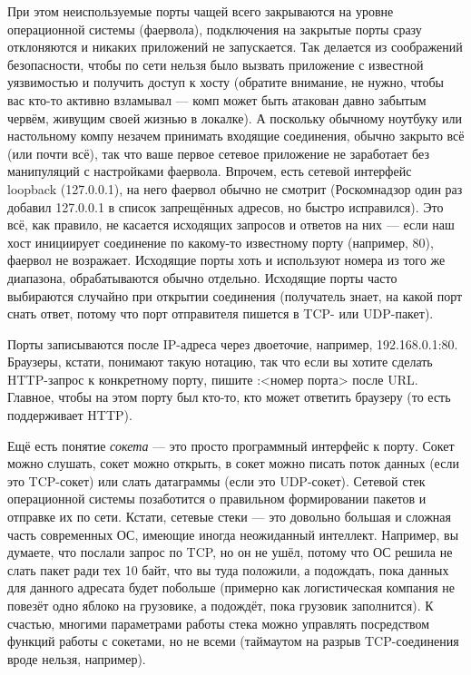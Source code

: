 \documentclass[a5paper]{article}
\begin{document}
При этом неиспользуемые порты чащей всего закрываются на уровне операционной системы (фаервола), подключения на закрытые порты сразу отклоняются и никаких приложений не запускается. Так делается из соображений безопасности, чтобы по сети нельзя было вызвать приложение с известной уязвимостью и получить доступ к хосту (обратите внимание, не нужно, чтобы вас кто-то активно взламывал --- комп может быть атакован давно забытым червём, живущим своей жизнью в локалке). А поскольку обычному ноутбуку или настольному компу незачем принимать входящие соединения, обычно закрыто всё (или почти всё), так что ваше первое сетевое приложение не заработает без манипуляций с настройками фаервола. Впрочем, есть сетевой интерфейс loopback (127.0.0.1), на него фаервол обычно не смотрит (Роскомнадзор один раз добавил 127.0.0.1 в список запрещённых адресов, но быстро исправился). Это всё, как правило, не касается исходящих запросов и ответов на них --- если наш хост инициирует соединение по какому-то известному порту (например, 80), фаервол не возражает. Исходящие порты хоть и используют номера из того же диапазона, обрабатываются обычно отдельно. Исходящие порты часто выбираются случайно при открытии соединения (получатель знает, на какой порт снать ответ, потому что порт отправителя пишется в TCP- или UDP-пакет). 

Порты записываются после IP-адреса через двоеточие, например, 192.168.0.1:80. Браузеры, кстати, понимают такую нотацию, так что если вы хотите сделать HTTP-запрос к конкретному порту, пишите :<номер порта> после URL. Главное, чтобы на этом порту был кто-то, кто может ответить браузеру (то есть поддерживает HTTP).

Ещё есть понятие \textit{сокета} --- это просто программный интерфейс к порту. Сокет можно слушать, сокет можно открыть, в сокет можно писать поток данных (если это TCP-сокет) или слать датаграммы (если это UDP-сокет). Сетевой стек операционной системы позаботится о правильном формировании пакетов и отправке их по сети. Кстати, сетевые стеки --- это довольно большая и сложная часть современных ОС, имеющие иногда неожиданный интеллект. Например, вы думаете, что послали запрос по TCP, но он не ушёл, потому что ОС решила не слать пакет ради тех 10 байт, что вы туда положили, а подождать, пока данных для данного адресата будет побольше (примерно как логистическая компания не повезёт одно яблоко на грузовике, а подождёт, пока грузовик заполнится). К счастью, многими параметрами работы стека можно управлять посредством функций работы с сокетами, но не всеми (таймаутом на разрыв TCP-соединения вроде нельзя, например).
\end{document}
